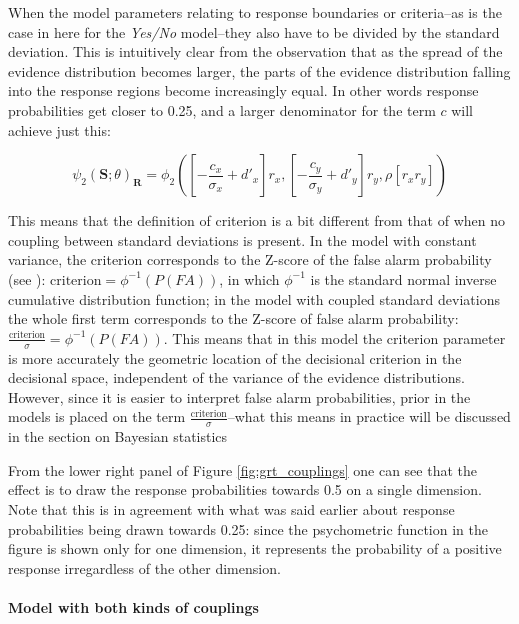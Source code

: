 \documentclass{article}\usepackage{knitr}
\begin{document}
When the model parameters relating to response boundaries or criteria--as is the case in here for the \textit{Yes/No} model--they also have to be divided by the standard deviation. This is intuitively clear from the observation that as the spread of the evidence distribution becomes larger, the parts of the evidence distribution falling into the response regions become increasingly equal. In other words response probabilities get closer to 0.25, and a larger denominator for the term $c$ will achieve just this:

\begin{equation}
\psi_2(\bm{S}; \theta)_{\bm{R}} = \phi_2([-\frac{c_x}{\sigma_x} + d'_x]r_x, [-\frac{c_y}{\sigma_y} + d'_y] r_y, \rho [r_x r_y])
\label{eq:generalPfun_varshift}
\end{equation}  

This means that the definition of criterion is a bit different from that of when no coupling between standard deviations is present. In the model with constant variance, the criterion corresponds to the Z-score of the false alarm probability (see \citet[Chapter 6]{kingdomprins2010}): $\text{criterion} = \phi^{-1}(P(FA))$, in which $\phi^{-1}$ is the standard normal inverse cumulative distribution function; in the model with coupled standard deviations the whole first term corresponds to the Z-score of false alarm probability: $\frac{\text{criterion}}{\sigma} = \phi^{-1}(P(FA))$. This means that in this model the criterion parameter is more accurately the geometric location of the decisional criterion in the decisional space, independent of the variance of the evidence distributions. However, since it is easier to interpret false alarm probabilities, prior in the models is placed on the term $\frac{\text{criterion}}{\sigma}$--what this means in practice will be discussed in the section on Bayesian statistics

From the lower right panel of Figure \ref{fig:grt_couplings} one can see that the effect is to draw the response probabilities towards 0.5 on a single dimension. Note that this is in agreement with what was said earlier about response probabilities being drawn towards 0.25: since the psychometric function in the figure is shown only for one dimension, it represents the probability of a positive response irregardless of the other dimension. 

\paragraph{Model with both kinds of couplings}
\end{document}
